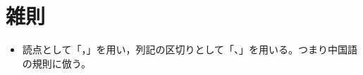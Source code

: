\part{雑則}
    \begin{itemize}
        \item 読点として「，」を用い，列記の区切りとして「、」を用いる。つまり中国語の規則に倣う。
    \end{itemize}
